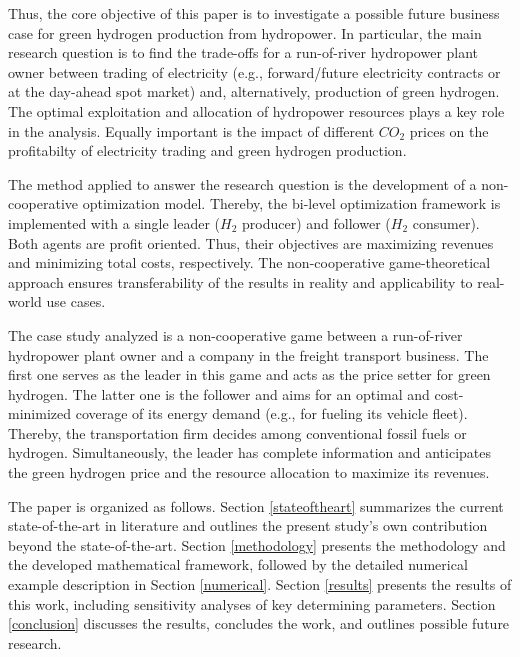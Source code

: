 \documentclass[review]{elsarticle}
\begin{document}
Thus, the core objective of this paper is to investigate a possible future business case for green hydrogen production from hydropower. In particular, the main research question is to find the trade-offs for a run-of-river hydropower plant owner between trading of electricity (e.g., forward/future electricity contracts or at the day-ahead spot market) and, alternatively, production of green hydrogen. The optimal exploitation and allocation of hydropower resources plays a key role in the analysis. Equally important is the impact of different $CO_2$ prices on the profitabilty of electricity trading and green hydrogen production.\vspace{0.3cm} 

The method applied to answer the research question is the development of a non-cooperative optimization model. Thereby, the bi-level optimization framework is implemented with a single leader ($H_2$ producer) and follower ($H_2$ consumer). Both agents are profit oriented. Thus, their objectives are maximizing revenues and minimizing total costs, respectively. The non-cooperative game-theoretical approach ensures transferability of the results in reality and applicability to real-world use cases.\vspace{0.3cm} 

The case study analyzed is a non-cooperative game between a run-of-river hydropower plant owner and a company in the freight transport business. The first one serves as the leader in this game and acts as the price setter for green hydrogen. The latter one is the follower and aims for an optimal and cost-minimized coverage of its energy demand (e.g., for fueling its vehicle fleet). Thereby, the transportation firm decides among conventional fossil fuels or hydrogen. Simultaneously, the leader has complete information and anticipates the green hydrogen price and the resource allocation to maximize its revenues.\vspace{0.3cm} 

The paper is organized as follows. Section \ref{stateoftheart} summarizes the current state-of-the-art in literature and outlines the present study's own contribution beyond the state-of-the-art. Section \ref{methodology} presents the methodology and the developed mathematical framework, followed by the detailed numerical example description in Section \ref{numerical}. Section \ref{results} presents the results of this work, including sensitivity analyses of key determining parameters. Section \ref{conclusion} discusses the results, concludes the work, and outlines possible future research.
\end{document}
